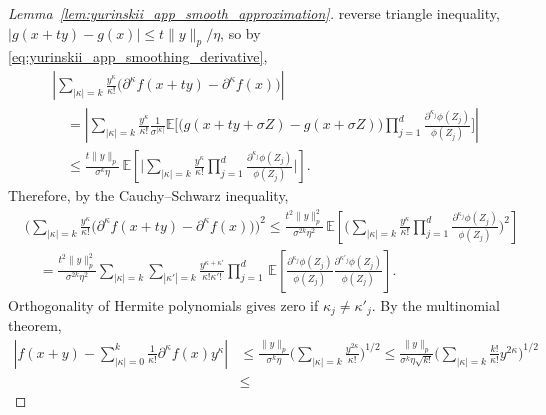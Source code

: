 \documentclass[11pt,lof]{puthesis}
\newcommand{\E}{\ensuremath{\mathbb{E}}}
\theoremstyle{break}
\theoremstyle{proof}
\newtheorem{proof}{Proof}
\begin{document}
\begin{proof}[Lemma~\ref{lem:yurinskii_app_smooth_approximation}]
  reverse triangle inequality, $|g(x + t y) - g(x)| \leq t \|y\|_p / \eta$,
  so by \eqref{eq:yurinskii_app_smoothing_derivative},
  \begin{align*}
    &\left|
    \sum_{|\kappa|=k}
    \frac{y^\kappa}{\kappa!}
    \big(
      \partial^{\kappa} f(x + t y)
      - \partial^{\kappa} f(x)
    \big)
    \right| \\
    &\quad=
    \left|
    \sum_{|\kappa|=k}
    \frac{y^\kappa}{\kappa!}
    \frac{1}{\sigma^{|\kappa|}}
    \E \Bigg[
      \big(
        g(x + t y + \sigma Z)
        - g(x + \sigma Z)
      \big)
      \prod_{j=1}^{d}
      \frac{\partial^{\kappa_j}\phi(Z_j)}{\phi(Z_j)}
    \Bigg]
    \right| \\
    &\quad\leq
    \frac{t \|y\|_p}{\sigma^k \eta}
    \, \E \left[
      \Bigg|
      \sum_{|\kappa|=k}
      \frac{y^\kappa}{\kappa!}
      \prod_{j=1}^{d}
      \frac{\partial^{\kappa_j}\phi(Z_j)}{\phi(Z_j)}
      \Bigg|
    \right].
  \end{align*}
  Therefore, by the Cauchy--Schwarz inequality,
  \begin{align*}
    &\Bigg(
      \sum_{|\kappa|=k}
      \frac{y^\kappa}{\kappa!}
      \big(
        \partial^{\kappa} f(x + t y)
        - \partial^{\kappa} f(x)
      \big)
    \Bigg)^2
    \leq
    \frac{t^2 \|y\|_p^2}{\sigma^{2k} \eta^2}
    \, \E \left[
      \Bigg(
        \sum_{|\kappa|=k}
        \frac{y^\kappa}{\kappa!}
        \prod_{j=1}^{d}
        \frac{\partial^{\kappa_j} \phi(Z_j)}{\phi(Z_j)}
      \Bigg)^2
    \right] \\
    &\quad=
    \frac{t^2 \|y\|_p^2}{\sigma^{2k} \eta^2}
    \sum_{|\kappa|=k}
    \sum_{|\kappa'|=k}
    \frac{y^{\kappa + \kappa'}}{\kappa! \kappa'!}
    \prod_{j=1}^{d}
    \, \E \left[
      \frac{\partial^{\kappa_j} \phi(Z_j)}{\phi(Z_j)}
      \frac{\partial^{\kappa'_j} \phi(Z_j)}{\phi(Z_j)}
    \right].
  \end{align*}
  Orthogonality of Hermite polynomials gives zero if
  $\kappa_j \neq \kappa'_j$. By the multinomial theorem,
  \begin{align*}
    \left|
    f(x + y)
    - \sum_{|\kappa|=0}^{k}
    \frac{1}{\kappa!}
    \partial^{\kappa} f(x)
    y^\kappa
    \right|
    &\leq
    \frac{\|y\|_p}{\sigma^k \eta}
    \Bigg(
      \sum_{|\kappa|=k}
      \frac{y^{2 \kappa}}{\kappa!}
    \Bigg)^{1/2}
    \leq
    \frac{\|y\|_p}{\sigma^k \eta \sqrt{k!}}
    \Bigg(
      \sum_{|\kappa|=k}
      \frac{k!}{\kappa!}
      y^{2 \kappa}
    \Bigg)^{1/2} \\
    &\leq

\end{align*}
\end{proof}
\end{document}
